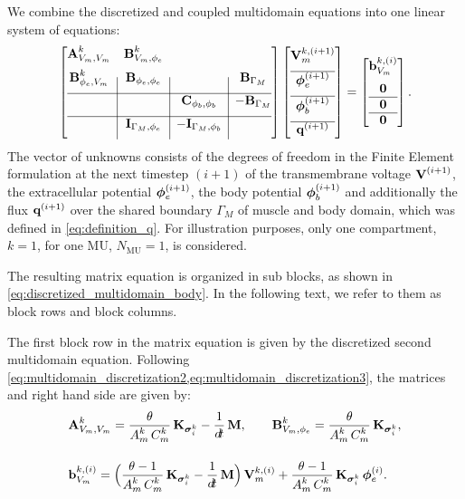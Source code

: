 We combine the discretized and coupled multidomain equations into one linear system of equations:
\begin{align}\label{eq:discretized_multidomain_body}
  \left[
  \begin{array}{@{}c|c|c|c@{}}
    \bfA_{V_m,V_m}^k & \bfB_{V_m,\phi_e}^k & &\\[2mm]
    \bfB_{\phi_e,V_m}^k & \bfB_{\phi_e,\phi_e} & &\bfB_{\Gamma_M} \\[2mm] \hline
    &&\bfC_{\phi_b,\phi_b} & -\bfB_{\Gamma_M}\\[2mm]\hline
    & \bfI_{\Gamma_M,\phi_e} & -\bfI_{\Gamma_M,\phi_b} &\\[2mm]
  \end{array}
  \right]
  \left[
  \begin{array}{@{}c@{}}
    \bfV_{m}^{k,(i+1)}  \\[2mm]\hline 
    \bfphi_{e}^{(i+1)} \\[2mm]\hline
    \bfphi_{b}^{(i+1)}  \\[2mm]\hline
    \bfq^{(i+1)}
  \end{array}\right]
  = 
  \left[\begin{array}{@{}c@{}}
    \bfb_{V_m}^{k,(i)} \\[2mm]
    \bfzero\\\hline
    \bfzero\\\hline 
    \bfzero
  \end{array}\right].
\end{align}
The vector of unknowns consists of the degrees of freedom in the Finite Element formulation at the next timestep $(i+1)$ of the transmembrane voltage $\textbf{V}^{(i+1)}$, the extracellular potential $\boldsymbol{\phi}_{e}^{(i+1)}$, the body potential $\boldsymbol{\phi}_{b}^{(i+1)}$ and additionally the flux $\textbf{q}^{(i+1)}$ over the shared boundary $\Gamma_M$ of muscle and body domain, which was defined in \cref{eq:definition_q}. For illustration purposes, only one compartment, $k=1$, for one MU, $N_\text{MU}=1$, is considered.

The resulting matrix equation is organized in sub blocks, as shown in \cref{eq:discretized_multidomain_body}. In the following text, we refer to them as block rows and block columns.

The first block row in the matrix equation is given by the discretized second multidomain equation. Following \cref{eq:multidomain_discretization2,eq:multidomain_discretization3}, the matrices and right hand side are given by:
\begin{align*}
  &\bfA^k_{V_m,V_m} = \dfrac{\theta}{A_m^k\,C_m^k}\bfK_{\bfsigma_i^k} -\dfrac{1}{\dt}\bfM, \qquad
  \bfB^k_{V_m,\phi_e} = \dfrac{\theta}{A_m^k\,C_m^k}\bfK_{\bfsigma_i^k},\\[4mm]
  &\bfb_{V_m}^{k,(i)} = \Big( \dfrac{\theta-1}{A_m^k\,C_m^k}\bfK_{\bfsigma_i^k} - \dfrac{1}{\dt}\bfM\Big)\,\bfV_m^{k,(i)} 
      + \dfrac{\theta - 1}{A_m^k\,C_m^k}\bfK_{\bfsigma_i^k}\,\bfphi_e^{(i)}.
\end{align*}
%


